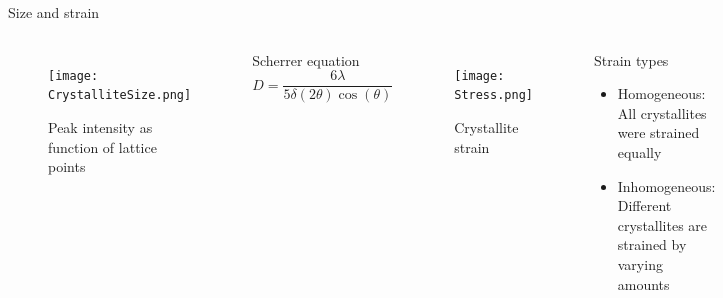 \documentclass{beamer}
\begin{document}
\begin{frame}{Size and strain}
    \begin{columns}
        \begin{figure}
            \centering
            \texttt{[image: CrystalliteSize.png]}
            \caption{Peak intensity as function of lattice points}
        \end{figure}
        \vspace{-0.5cm}
        \begin{exampleblock}{Scherrer equation}
        \begin{equation*}
            D = \frac{6 \lambda}{ 5 \delta(2\theta) \cos(\theta)}
        \end{equation*}
        \end{exampleblock}
        \begin{figure}
            \centering
            \texttt{[image: Stress.png]}
            \caption{Crystallite strain}
        \end{figure}
        \vspace{-0.5cm}
        \begin{block}{Strain types}
            \begin{itemize}
                \item Homogeneous: All crystallites were strained equally
                \item Inhomogeneous: Different crystallites are strained by varying amounts
            \end{itemize}
        \end{block}
    \end{columns}
\end{frame}
\end{document}
